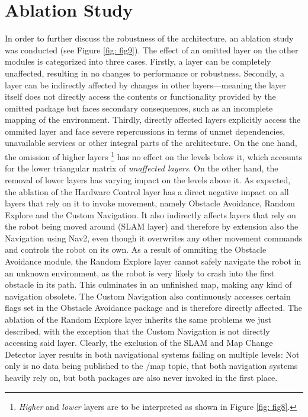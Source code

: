 \documentclass[%
paper=A4,               %
twoside=true,           %
openright,              %
11pt,                   %
bibliography=totoc,     %
titlepage=on,           %
DIV=12,                 %
BCOR=1.5cm,             %
parskip=half,            %
final
]{scrreprt}
\begin{document}
	\newpage
	
	
	\section{Ablation Study}  
	In order to further discuss the robustness of the architecture, an ablation study was conducted (see Figure \ref{fig: fig9}). The effect of an omitted layer on the other modules is categorized into three cases. Firstly, a layer can be completely unaffected, resulting in no changes to performance or robustness. Secondly, a layer can be indirectly affected by changes in other layers—meaning the layer itself does not directly access the contents or functionality provided by the omitted package but faces secondary consequences, such as an incomplete mapping of the environment. Thirdly, directly affected layers explicitly access the ommited layer and face severe repercussions in terms of unmet dependencies, unavailable services or other integral parts of the architecture. On the one hand, the omission of higher layers \footnote{\textit{Higher} and \textit{lower} layers are to be interpreted as shown in Figure \ref{fig: fig8}.} has no effect on the levels below it, which accounts for the lower triangular matrix of \textit{unaffected layers}. On the other hand, the removal of lower layers has varying impact on the levels above it. \newline 
	As expected, the ablation of the Hardware Control layer has a direct negative impact on all layers that rely on it to invoke movement, namely Obstacle Avoidance, Random Explore and the Custom Navigation. It also indirectly affects layers that rely on the robot being moved around (SLAM layer) and therefore by extension also the Navigation using Nav2, even though it overwrites any other movement commands and controls the robot on its own. \newline
	As a result of ommiting the Obstacle Avoidance module, the Random Explore layer cannot safely navigate the robot in an unknown environment, as the robot is very likely to crash into the first obstacle in its path. This culminates in an unfinished map, making any kind of navigation obsolete. The Custom Navigation also continuously accesses certain flags set in the Obstacle Avoidance package and is therefore directly affected. \newline
	The ablation of the Random Explore layer inherits the same problems we just described, with the exception that the Custom Navigation is not directly accessing said layer. \newline
	Clearly, the exclusion of the SLAM and Map Change Detector layer results in both navigational systems failing on multiple levels: Not only is no data being published to the /map topic, that both navigation systems heavily rely on, but both packages are also never invoked in the first place.  
	
\end{document}
